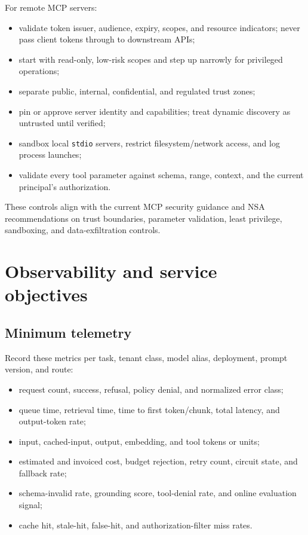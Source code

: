 \documentclass[10pt]{article}
\newcommand{\code}[1]{\texttt{#1}}
\begin{document}
For remote MCP servers:

\begin{itemize}
  \item validate token issuer, audience, expiry, scopes, and resource indicators; never pass client tokens through to downstream APIs;
  \item start with read-only, low-risk scopes and step up narrowly for privileged operations;
  \item separate public, internal, confidential, and regulated trust zones;
  \item pin or approve server identity and capabilities; treat dynamic discovery as untrusted until verified;
  \item sandbox local \code{stdio} servers, restrict filesystem/network access, and log process launches;
  \item validate every tool parameter against schema, range, context, and the current principal's authorization.
\end{itemize}

These controls align with the current MCP security guidance and NSA recommendations on trust boundaries, parameter validation, least privilege, sandboxing, and data-exfiltration controls.\cite{mcp-security,nsa-mcp}

\section{Observability and service objectives}

\subsection{Minimum telemetry}

Record these metrics per task, tenant class, model alias, deployment, prompt version, and route:

\begin{itemize}
  \item request count, success, refusal, policy denial, and normalized error class;
  \item queue time, retrieval time, time to first token/chunk, total latency, and output-token rate;
  \item input, cached-input, output, embedding, and tool tokens or units;
  \item estimated and invoiced cost, budget rejection, retry count, circuit state, and fallback rate;
  \item schema-invalid rate, grounding score, tool-denial rate, and online evaluation signal;
  \item cache hit, stale-hit, false-hit, and authorization-filter miss rates.
\end{itemize}
\end{document}
